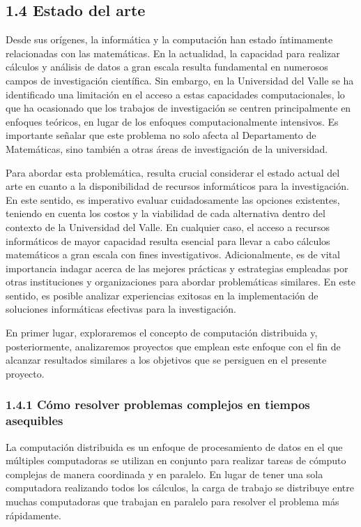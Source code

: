 \begin{spacing}{1.5}
\begin{multicols}{2}
  \subsection{1.4 Estado del arte}
  Desde sus orígenes, la informática y la computación han estado íntimamente relacionadas con las matemáticas. En la actualidad, la capacidad para realizar cálculos y análisis de datos a gran escala resulta fundamental en numerosos campos de investigación científica. Sin embargo, en la Universidad del Valle se ha identificado una limitación en el acceso a estas capacidades computacionales, lo que ha ocasionado que los trabajos de investigación se centren principalmente en enfoques teóricos, en lugar de los enfoques computacionalmente intensivos. Es importante señalar que este problema no solo afecta al Departamento de Matemáticas, sino también a otras áreas de investigación de la universidad.
  
  Para abordar esta problemática, resulta crucial considerar el estado actual del arte en cuanto a la disponibilidad de recursos informáticos para la investigación. En este sentido, es imperativo evaluar cuidadosamente las opciones existentes, teniendo en cuenta los costos y la viabilidad de cada alternativa dentro del contexto de la Universidad del Valle. En cualquier caso, el acceso a recursos informáticos de mayor capacidad resulta esencial para llevar a cabo cálculos matemáticos a gran escala con fines investigativos.\newline   
  Adicionalmente, es de vital importancia indagar acerca de las mejores prácticas y estrategias empleadas por otras instituciones y organizaciones para abordar problemáticas similares. En este sentido, es posible analizar experiencias exitosas en la implementación de soluciones informáticas efectivas para la investigación.
  
  En primer lugar, exploraremos el concepto de computación distribuida y, posteriormente, analizaremos proyectos que emplean este enfoque con el fin de alcanzar resultados similares a los objetivos que se persiguen en el presente proyecto. 

  \subsubsection{1.4.1 Cómo resolver problemas complejos en tiempos asequibles}
  
  La computación distribuida es un enfoque de procesamiento de datos en el que múltiples computadoras se utilizan en conjunto para realizar tareas de cómputo complejas de manera coordinada y en paralelo. En lugar de tener una sola computadora realizando todos los cálculos, la carga de trabajo se distribuye entre muchas computadoras que trabajan en paralelo para resolver el problema más rápidamente.


\end{multicols}
\end{spacing}
